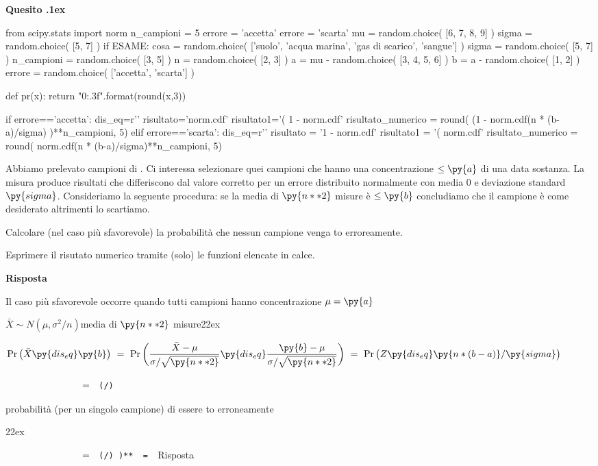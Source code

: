 \documentclass[11pt,twoside,a4paper]{article}
\def\Pr{{\rm Pr\,}}
\newcounter{quesito}
\newenvironment{question}{\addtocounter{quesito}{1}\bigskip\bigskip\par\textbf{Quesito \thequesito.\kern1ex}}{\vspace{\parskip}}
\newenvironment{answer}{\par\textbf{Risposta\quad}}{\vspace{\parskip}}
\begin{document}
\begin{question} %
\begin{pycode}
from scipy.stats import norm
n_campioni = 5
errore = 'accetta'
errore = 'scarta'
mu    = random.choice( [6, 7, 8, 9] )
sigma = random.choice( [5, 7] )
if ESAME:
    cosa = random.choice( ['suolo', 'acqua marina', 'gas di scarico', 'sangue'] )
    sigma = random.choice( [5, 7] )
    n_campioni = random.choice( [3, 5] )
    n = random.choice( [2, 3] )
    a = mu - random.choice( [3, 4, 5, 6] )
    b = a - random.choice( [1, 2] )
    errore =  random.choice( ['accetta', 'scarta'] )

def pr(x):
    return "{0:.3f}".format(round(x,3))

if errore=='accetta':
    dis_eq=r'\le'
    risultato='norm.cdf'
    risultato1='( 1 - norm.cdf'
    risultato_numerico = round( (1 -  norm.cdf(n * (b-a)/sigma) )**n_campioni, 5)
elif errore=='scarta':
    dis_eq=r'\ge'
    risultato = '1 - norm.cdf'
    risultato1 = '( norm.cdf'
    risultato_numerico = round( norm.cdf(n * (b-a)/sigma)**n_campioni, 5)
\end{pycode}
Abbiamo prelevato  campioni di . Ci interessa selezionare quei campioni che hanno una concentrazione $\le\py{a}$ di una data sostanza. La misura produce risultati che differiscono dal valore corretto per un errore distribuito normalmente con media $0$ e deviazione standard $\py{sigma}$. Consideriamo la seguente procedura: se la media di $\py{n**2}$ misure è $\le\py{b}$ concludiamo che il campione è come desiderato altrimenti lo scartiamo.

Calcolare (nel caso più sfavorevole) la probabilità che nessun campione venga to erroreamente.

Esprimere il risutato numerico tramite (solo) le funzioni elencate in calce.
\begin{answer}

Il caso più sfavorevole occorre quando tutti  campioni hanno concentrazione $\mu=\py{a}$ 


$\bar X\sim N(\mu,\sigma^2/n)$\hfill media di $\py{n**2}$ misure\kern22ex

$\Pr\big(\bar X\py{dis_eq}\py{b}\big)\ =\ \Pr\bigg(\dfrac{\bar X-\mu}{\sigma/\sqrt{\py{n**2}}}\py{dis_eq}\dfrac{\py{b}-\mu}{\sigma/\sqrt{\py{n**2}}}\bigg)\ =\  \Pr\big(Z\py{dis_eq}\py{n * (b-a) } /\py{sigma} \big)$\medskip

$\phantom{\Pr\big(\bar X\le\py{b}\big)}\ =\ ${\tt\ (/)}\hfill\parbox[t]{43ex}{ probabilità (per un singolo campione) di essere to erroneamente}\kern22ex\medskip

$\phantom{\Pr\big(\bar X\le\py{b}\big)}\ =\ ${\color{blue}\tt\ (/) )** }{\tt\ =\  }\hfill {\color{blue}Risposta}

\end{answer}
\end{question}
\end{document}
